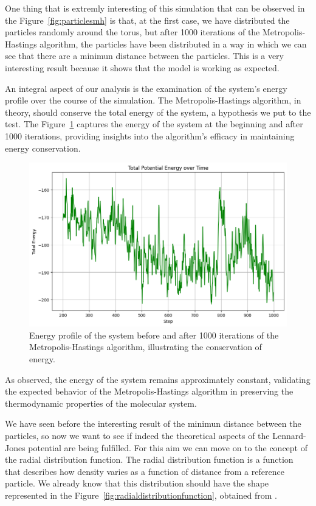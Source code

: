 \documentclass{article}
\begin{document}
One thing that is extremly interesting of this simulation that can be observed in the Figure~\ref{fig:particlesmh} is that, at the first case, we have distributed the particles randomly around the torus, but after 1000 iterations of the Metropolis-Hastings algorithm, the particles have been distributed in a way in which we can see that there are a minimun distance between the particles. This is a very interesting result because it shows that the model is working as expected.

An integral aspect of our analysis is the examination of the system's energy profile over the course of the simulation. The Metropolis-Hastings algorithm, in theory, should conserve the total energy of the system, a hypothesis we put to the test. The Figure~\ref{fig:energymh} captures the energy of the system at the beginning and after 1000 iterations, providing insights into the algorithm's efficacy in maintaining energy conservation.

\begin{figure}[H]
	\centering
	\includegraphics[width=0.75\linewidth]{./Figures/MCMC/LennardJones/energy.png}
	\caption{Energy profile of the system before and after 1000 iterations of the Metropolis-Hastings algorithm, illustrating the conservation of energy.}
	\label{fig:energymh}
\end{figure}

As observed, the energy of the system remains approximately constant, validating the expected behavior of the Metropolis-Hastings algorithm in preserving the thermodynamic properties of the molecular system.

We have seen before the interesting result of the minimun distance between the particles, so now we want to see if indeed the theoretical aspects of the Lennard-Jones potential are being fulfilled. For this aim we can move on to the concept of the radial distribution function. The radial distribution function is a function that describes how density varies as a function of distance from a reference particle. We already know that this distribution should have the shape represented in the Figure~\ref{fig:radialdistributionfunction}, obtained from \cite{wiki:radialdistributionfunction}.
\end{document}
